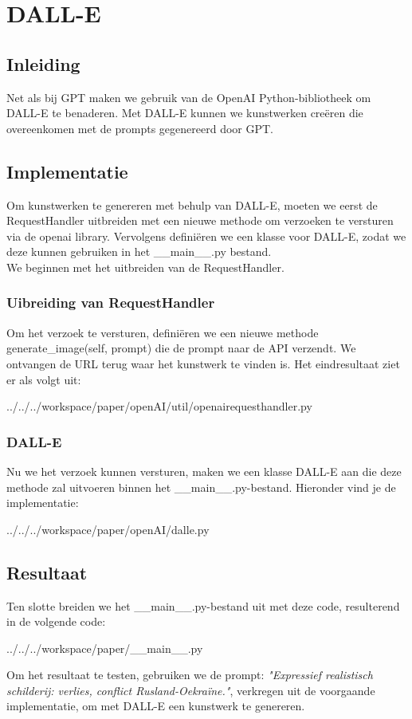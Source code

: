 \section{DALL-E}

\subsection{Inleiding}
Net als bij GPT maken we gebruik van de OpenAI Python-bibliotheek om DALL-E te benaderen. Met DALL-E kunnen we kunstwerken creëren die overeenkomen met de prompts gegenereerd door GPT.

\subsection{Implementatie}
Om kunstwerken te genereren met behulp van DALL-E, moeten we eerst de RequestHandler uitbreiden met een nieuwe methode om verzoeken te versturen via de openai library. Vervolgens definiëren we een klasse voor DALL-E, zodat we deze kunnen gebruiken in het 
\_\_main\_\_.py bestand. \\

We beginnen met het uitbreiden van de RequestHandler.

\subsubsection{Uibreiding van RequestHandler}
Om het verzoek te versturen, definiëren we een nieuwe methode generate\_image(self, prompt) die de prompt naar de API verzendt. We ontvangen de URL terug waar het kunstwerk te vinden is. Het eindresultaat ziet er als volgt uit:
\begin{pythoncode}{../../../workspace/paper/openAI/util/openairequesthandler.py}
\end{pythoncode}

\subsubsection{DALL-E}
Nu we het verzoek kunnen versturen, maken we een klasse DALL-E aan die deze methode zal uitvoeren binnen het  \_\_main\_\_.py-bestand. Hieronder vind je de implementatie:
\begin{pythoncode}{../../../workspace/paper/openAI/dalle.py}
\end{pythoncode}
    
\subsection{Resultaat}
Ten slotte breiden we het \_\_main\_\_.py-bestand uit met deze code, resulterend in de volgende code:
\begin{pythoncode}{../../../workspace/paper/__main__.py}
\end{pythoncode}
Om het resultaat te testen, gebruiken we de prompt: \emph{"Expressief realistisch schilderij: verlies, conflict Rusland-Oekraïne."}, verkregen uit de voorgaande implementatie, om met DALL-E een kunstwerk te genereren. \\

